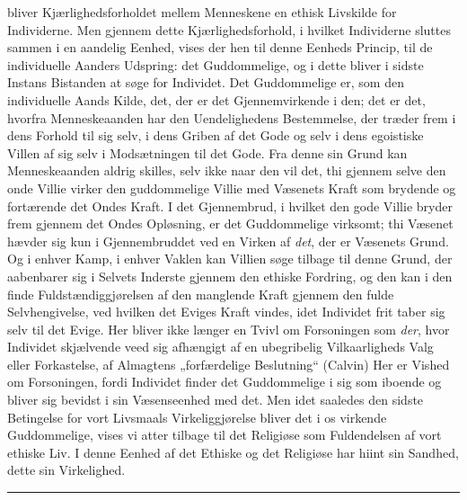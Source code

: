 \documentclass[12pt,a4paper,openany]{book}
\newcommand{\opage}[1]{\marginnote{\footnotesize\textit{[#1]}}}
\begin{document}
bliver Kjærlighedsforholdet mellem Menneskene en ethisk
Livskilde for Individerne. Men gjennem dette Kjærlighedsforhold,
i hvilket Individerne sluttes sammen i en aandelig
\opage{507}Eenhed, vises der hen til denne Eenheds Princip, til de individuelle
Aanders Udspring: det Guddommelige, og i dette
bliver i sidste Instans Bistanden at søge for Individet. Det
Guddommelige er, som den individuelle Aands Kilde, det,
der er det Gjennemvirkende i den; det er det, hvorfra
Menneskeaanden har den Uendelighedens Bestemmelse, der
træder frem i dens Forhold til sig selv, i dens Griben af
det Gode og selv i dens egoistiske Villen af sig selv i Modsætningen
til det Gode. Fra denne sin Grund kan Menneskeaanden
aldrig skilles, selv ikke naar den vil det, thi gjennem
selve den onde Villie virker den guddommelige Villie med
Væsenets Kraft som brydende og fortærende det Ondes Kraft.
I det Gjennembrud, i hvilket den gode Villie bryder frem
gjennem det Ondes Opløsning, er det Guddommelige virksomt;
thi Væsenet hævder sig kun i Gjennembruddet ved en
Virken af \emph{det}, der er Væsenets Grund. Og i enhver Kamp,
i enhver Vaklen kan Villien søge tilbage til denne Grund,
der aabenbarer sig i Selvets Inderste gjennem den ethiske
Fordring, og den kan i den finde Fuldstændiggjørelsen af
den manglende Kraft gjennem den fulde Selvhengivelse, ved
hvilken det Eviges Kraft vindes, idet Individet frit taber
sig selv til det Evige. Her bliver ikke længer en Tvivl
om Forsoningen som \emph{der}, hvor Individet skjælvende veed sig
afhængigt af en ubegribelig Vilkaarligheds Valg eller Forkastelse,
af Almagtens „forfærdelige Beslutning“ (Calvin)
Her er Vished om Forsoningen, fordi Individet finder det
Guddommelige i sig som iboende og bliver sig bevidst i sin
Væsenseenhed med det. Men idet saaledes den sidste Betingelse
for vort Livsmaals Virkeliggjørelse bliver det i os
virkende Guddommelige, vises vi atter tilbage til det Religiøse
som Fuldendelsen af vort ethiske Liv. I denne Eenhed af
det Ethiske og det Religiøse har hiint sin Sandhed, dette sin
Virkelighed.

\begin{center}\rule{1.8cm}{0.4pt}\end{center}
\end{document}
